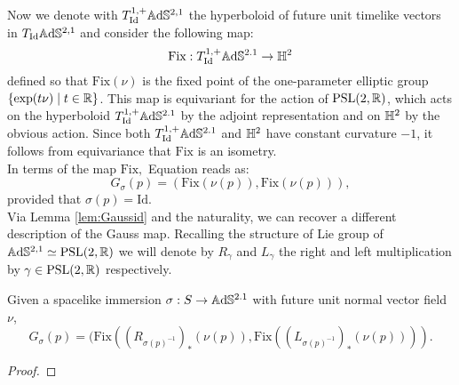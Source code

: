 Now we denote with $T_{\text{Id}}^{1,+}\mathbb{A}\mathrm{d}\mathbb{S}^{2,1}$ the hyperboloid of future unit timelike vectors in $T_{\text{Id}}\mathbb{A}\mathrm{d}\mathbb{S}^{2,1}$ and consider the following map: 
\[
    \text{Fix}:T_{\text{Id}}^{1,+}\mathbb{A}\mathrm{d}\mathbb{S}^{2.1}\to\mathbb{H}^2
\]
defined so that $\text{Fix}(\nu)$ is the fixed point of the one-parameter elliptic group $\{\exp(t\nu)\;|\;t\in\mathbb{R}\}$. This map is equivariant for the action of $\text{PSL}(2,\mathbb{R})$, which acts on the hyperboloid $T_{\text{Id}}^{1,+}\mathbb{A}\mathrm{d}\mathbb{S}^{2.1}$ by the adjoint representation and on $\mathbb{H}^2$ by the obvious action. Since both $T_{\text{Id}}^{1,+}\mathbb{A}\mathrm{d}\mathbb{S}^{2.1}$ and $\mathbb{H}^2$ have constant curvature $-1$, it follows from equivariance that $\text{Fix}$ is an isometry.  \\
In terms of the map $\text{Fix},$ Equation  reads as: 
\begin{equation}\label{eq:Gaussfix}
    G_\sigma(p)=(\text{Fix}(\nu(p)),\text{Fix}(\nu(p))),
\end{equation}
provided that $\sigma(p)=\text{Id}.$\\ Via Lemma \ref{lem:Gaussid} and the naturality, we can recover a different description of the Gauss map. Recalling the structure of Lie group of $\mathbb{A}\mathrm{d}\mathbb{S}^{2,1}\simeq\text{PSL}(2,\mathbb{R})$ we will denote by $R_{\gamma } $ and $L_{\gamma} $ the right and left multiplication by $\gamma\in\text{PSL}(2,\mathbb{R})$ respectively. 

\begin{lemma}
    Given a spacelike immersion $\sigma: S\to \mathbb{A}\mathrm{d}\mathbb{S}^{2.1}$ with future unit normal vector field $\nu$,
    \[
        G_\sigma(p)=(\text{Fix}((R_{\sigma(p)^{-1}})_* (\nu(p)),\text{Fix}((L_{\sigma(p)^{-1}})_* (\nu(p)))).
    \]
\end{lemma}

\begin{proof}

        
        
\end{proof}

